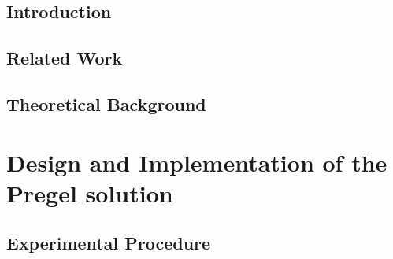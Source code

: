 \documentclass{legrand}
\begin{document}







\setcounter{page}{0}



\tableofcontents

\listoffigures

\listoftables


\chapter{Introduction}
\setcounter{page}{0} %
\label{chapter:intro}


\chapter{Related Work}
\label{chapter:related}


\chapter{Theoretical Background}
\label{chapter:theory}


\part{Design and Implementation of the Pregel solution}

\chapter{Experimental Procedure}
\label{chapter:experiment}

\end{document}
